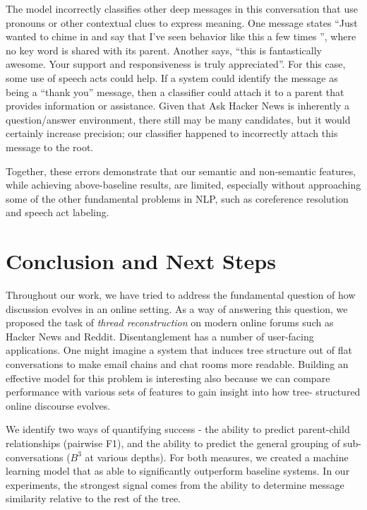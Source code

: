 \documentclass{article}
\begin{document}
The model incorrectly classifies other deep messages in this conversation that 
use pronouns or other contextual clues to express meaning. One message states 
``Just wanted to chime in and say that I've seen behavior like this a few times
'', where no key word is shared with its parent. Another says, ``this is 
fantastically awesome. Your support and responsiveness is truly appreciated''. 
For this case, some use of speech acts could help. If a system could identify 
the message as being a ``thank you'' message, then a classifier could attach 
it to a parent that provides information or assistance. Given that Ask Hacker 
News is inherently a question/answer environment, there still may be many 
candidates, but it would certainly increase precision; our classifier happened 
to incorrectly attach this message to the root.

Together, these errors demonstrate that our semantic and non-semantic 
features, while achieving above-baseline results, are limited, especially 
without approaching some of the other fundamental problems in NLP, such as 
coreference resolution and speech act labeling.

\section{Conclusion and Next Steps}
\label{sec:next_steps}
Throughout our work, we have tried to address the fundamental question of how
discussion evolves in an online setting. As a way of answering this question,
we proposed the task of \textit{thread reconstruction} on modern online forums
such as Hacker News and Reddit. Disentanglement has a number of user-facing
applications. One might imagine a system that induces tree structure out of
flat conversations to make email chains and chat rooms more readable. Building
an effective model for this problem is interesting also because we can compare
performance with various sets of features to gain insight into how tree-
structured online discourse evolves.

We identify two ways of quantifying success - the ability to
predict parent-child relationships (pairwise F1), and the ability to 
predict the general grouping of sub-conversations ($B^3$ at various depths). For
both measures, we created a machine learning model that as able to significantly 
outperform baseline systems. In our experiments, the strongest signal comes from
the ability to determine message similarity relative to the rest of the tree.
\end{document}
